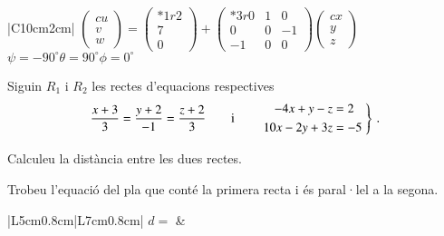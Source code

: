 \documentclass[10pt,catalan]{article}
\begin{document}
\begin{solucio}
\begin{center}
\begin{tabular}{|C{10cm}{2cm}|}
\hline
$\begin{pmatrix}{c} u \\ v \\ w\end{pmatrix} = 
\begin{pmatrix}{*{1}r} 2\\ 7\\ 0\end{pmatrix} + 
\begin{pmatrix}{*{3}r} 0 & 1 & 0\\ 0 & 0 & -1\\ -1 & 0 & 0\end{pmatrix}
\begin{pmatrix}{c} x \\ y \\ z\end{pmatrix}$ \\
\hline
{}
{$\psi=-90^\circ$\hspace{1.7cm}$\theta=90^\circ$\hspace{1.7cm}$\phi=0^\circ$} \\
\hline
\end{tabular}
\end{center}
\end{solucio}





\begin{enunciat}
Siguin $R_1$ i $R_2$ les rectes d'equacions respectives
\[
  \frac{x + 3}{3} = \frac{y + 2}{-1} = \frac{z + 2}{3}\qquad\text{i}\qquad \left.\aligned - 4 x + y - z &= 2 \\ 10 x - 2 y + 3 z &= -5 \endaligned\;\right\}\,.
\]
\begin{apartats}
\item Calculeu la distància entre les dues rectes.
\item Trobeu l'equació del pla que conté la primera recta i és paral·lel a la segona. 
\end{apartats}
\end{enunciat}

\begin{quadricula}
\begin{tabular}{|L{5cm}{0.8cm}|L{7cm}{0.8cm}|}
\hline
$d=$ & \\ 
\hline
\end{tabular}
\end{quadricula}
\end{document}
